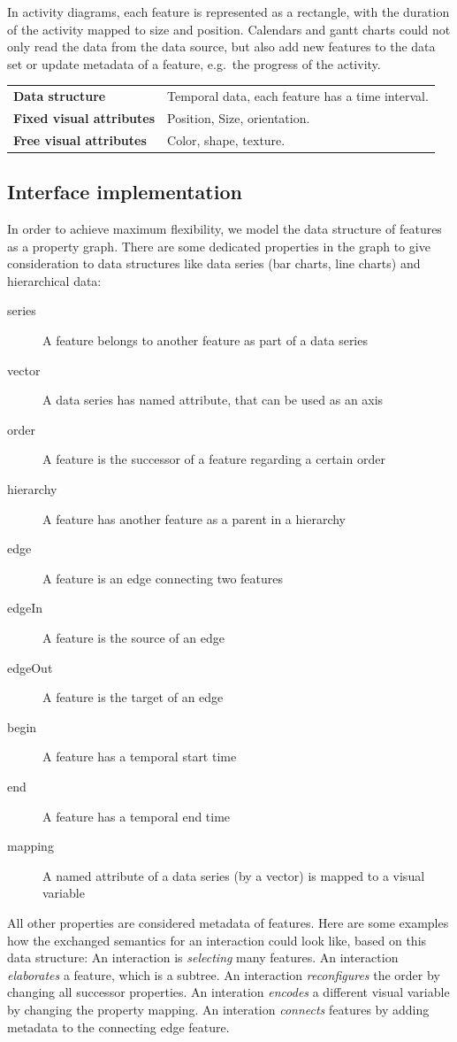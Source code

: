 \documentclass{article}
\newcommand{\conceptTable}[3]{%
    \begin{center}
    {\small
        \begin{tabulary}{\textwidth}{ll}
            \bf Data structure & #1 \\

            \bf Fixed visual attributes & #2 \\

            \bf Free visual attributes & #3  \\
        \end{tabulary}
    }
    \end{center}
}
\begin{document}
In activity diagrams, each feature is represented as a rectangle, with the duration of the activity mapped to size and position.
Calendars and gantt charts could not only read the data from the data source, but also add new features to the data set or update metadata of a feature, e.g.\ the progress of the activity.

\conceptTable{Temporal data, each feature has a time interval.}{Position, Size, orientation.}{Color, shape, texture.}


\subsection{Interface implementation}

In order to achieve maximum flexibility, we model the data structure of features as a property graph.
There are some dedicated properties in the graph to give consideration to data structures like data series (bar charts, line charts) and hierarchical data: 

\begin{description}
\item[series] 
    A feature belongs to another feature as part of a data series
\item[vector]
    A data series has named attribute, that can be used as an axis
\item[order]
    A feature is the successor of a feature regarding a certain order
\item[hierarchy]
    A feature has another feature as a parent in a hierarchy
\item[edge]
    A feature is an edge connecting two features
\item[edgeIn]
    A feature is the source of an edge
\item[edgeOut]
    A feature is the target of an edge
\item[begin]
    A feature has a temporal start time
\item[end]
    A feature has a temporal end time
\item[mapping]
    A named attribute of a data series (by a vector) is mapped to a visual variable
\end{description}

All other properties are considered metadata of features.
Here are some examples how the exchanged semantics for an interaction could look like, based on this data structure:
An interaction is \emph{selecting} many features.
An interaction \emph{elaborates} a feature, which is a subtree.
An interaction \emph{reconfigures} the order by changing all successor properties. 
An interation \emph{encodes} a different visual variable by changing the property mapping.
An interation \emph{connects} features by adding metadata to the connecting edge feature. 
\end{document}
